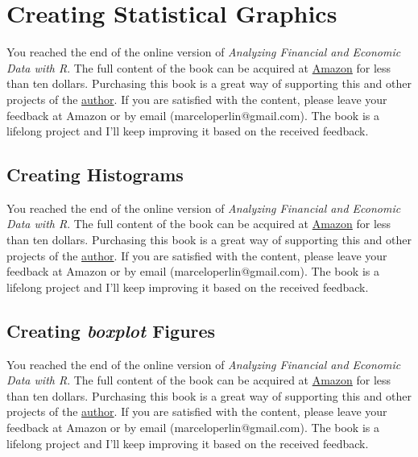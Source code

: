\documentclass[
  12pt,
]{book}
\newenvironment{pleasebuyit}
{\begin{noteblock}
		
	} {\end{noteblock}}
\begin{document}
\hypertarget{creating-statistical-graphics}{%
\section{Creating Statistical Graphics}\label{creating-statistical-graphics}}

\begin{pleasebuyit}
You reached the end of the online version of \emph{Analyzing Financial
and Economic Data with R}. The full content of the book can be acquired
at \href{https://www.amazon.com/dp/B084LSNXMN}{Amazon} for less than ten
dollars. Purchasing this book is a great way of supporting this and
other projects of the \href{https://www.msperlin.com/}{author}. If you
are satisfied with the content, please leave your feedback at Amazon or
by email (marceloperlin@gmail.com). The book is a lifelong project and
I'll keep improving it based on the received feedback.
\end{pleasebuyit}

\hypertarget{creating-histograms}{%
\subsection{Creating Histograms}\label{creating-histograms}}

\begin{pleasebuyit}
You reached the end of the online version of \emph{Analyzing Financial
and Economic Data with R}. The full content of the book can be acquired
at \href{https://www.amazon.com/dp/B084LSNXMN}{Amazon} for less than ten
dollars. Purchasing this book is a great way of supporting this and
other projects of the \href{https://www.msperlin.com/}{author}. If you
are satisfied with the content, please leave your feedback at Amazon or
by email (marceloperlin@gmail.com). The book is a lifelong project and
I'll keep improving it based on the received feedback.
\end{pleasebuyit}

\hypertarget{creating-boxplot-figures}{%
\subsection{\texorpdfstring{Creating \emph{boxplot} Figures}{Creating boxplot Figures}}\label{creating-boxplot-figures}}

\begin{pleasebuyit}
You reached the end of the online version of \emph{Analyzing Financial
and Economic Data with R}. The full content of the book can be acquired
at \href{https://www.amazon.com/dp/B084LSNXMN}{Amazon} for less than ten
dollars. Purchasing this book is a great way of supporting this and
other projects of the \href{https://www.msperlin.com/}{author}. If you
are satisfied with the content, please leave your feedback at Amazon or
by email (marceloperlin@gmail.com). The book is a lifelong project and
I'll keep improving it based on the received feedback.
\end{pleasebuyit}
\end{document}
